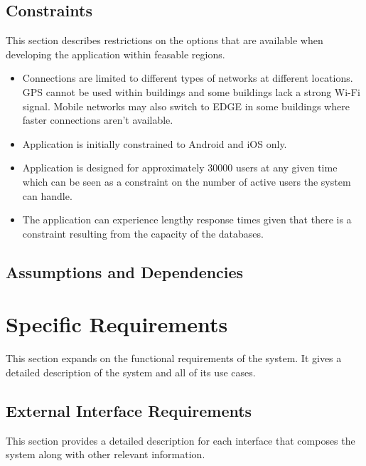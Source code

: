 \documentclass{article}
\begin{document}
	\subsection{Constraints}
	This section describes restrictions on the options that are available when developing the application within feasable regions.
		\begin{itemize}
			\item Connections are limited to different types of networks at different locations. GPS cannot be used within buildings and some buildings lack a strong Wi-Fi signal. Mobile networks may also switch to EDGE in some buildings where faster connections aren't available.
			\item Application is initially constrained to Android and iOS only.
			\item Application is designed for approximately 30000 users at any given time which can be seen as a constraint on the number of active users the system can handle.
			\item The application can experience lengthy response times given that there is a constraint resulting from the capacity of the databases.\newline
		\end{itemize}
	
	\subsection{Assumptions and Dependencies}
	
	\section{Specific Requirements}
	This section expands on the functional requirements of the system. It gives a detailed 	description of the system and all of its use cases.
	
	\subsection{External Interface Requirements}
	This section provides a detailed description for each interface that composes the system along with other relevant information.
\end{document}
